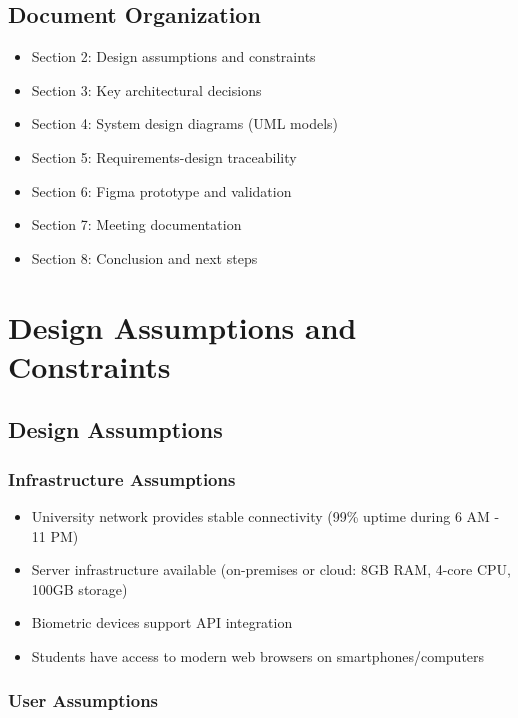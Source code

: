 \documentclass[12pt]{article}
\begin{document}
\subsection{Document Organization}

\begin{itemize}
\item Section 2: Design assumptions and constraints
\item Section 3: Key architectural decisions
\item Section 4: System design diagrams (UML models)
\item Section 5: Requirements-design traceability
\item Section 6: Figma prototype and validation
\item Section 7: Meeting documentation
\item Section 8: Conclusion and next steps
\end{itemize}

\section{Design Assumptions and Constraints}

\subsection{Design Assumptions}

\subsubsection{Infrastructure Assumptions}

\begin{itemize}
\item University network provides stable connectivity (99\% uptime during 6 AM - 11 PM)
\item Server infrastructure available (on-premises or cloud: 8GB RAM, 4-core CPU, 100GB storage)
\item Biometric devices support API integration
\item Students have access to modern web browsers on smartphones/computers
\end{itemize}

\subsubsection{User Assumptions}
\end{document}
